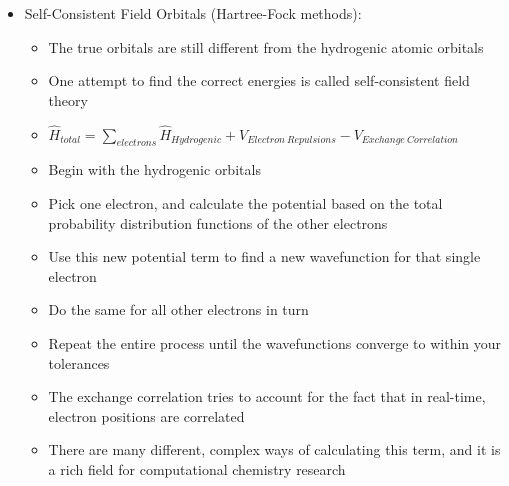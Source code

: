 \documentclass[12pt, openany, letterpaper]{memoir}
\begin{document}
\begin{itemize}
	\item Self-Consistent Field Orbitals (Hartree-Fock methods):
	\begin{itemize}
		\item The true orbitals are still different from the hydrogenic atomic orbitals
		\item One attempt to find the correct energies is called self-consistent field theory
		\item $\hat{H}_{total} = \displaystyle\sum\limits_{electrons}\hat{H}_{Hydrogenic} + V_{Electron~Repulsions} - V_{Exchange~Correlation}$
		\item Begin with the hydrogenic orbitals
		\item Pick one electron, and calculate the potential based on the total probability distribution functions of the other electrons
		\item Use this new potential term to find a new wavefunction for that single electron
		\item Do the same for all other electrons in turn
		\item Repeat the entire process until the wavefunctions converge to within your tolerances
		\item The exchange correlation tries to account for the fact that in real-time, electron positions are correlated
		\item There are many different, complex ways of calculating this term, and it is a rich field for computational chemistry research
	\end{itemize}
\end{itemize}
\end{document}
